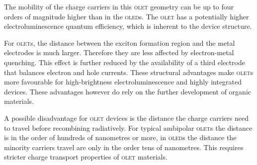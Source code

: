 The mobility of the charge carriers in this \textsc{olet} geometry can be up to four orders of magnitude higher than in the \textsc{oled}s. The \textsc{olet} has a potentially higher electroluminescence quantum efficiency, which is inherent to the device structure.

For \textsc{olet}s, the distance between the exciton formation region and the metal electrodes is much larger. Therefore they are less affected by electron-metal quenching. This effect is further reduced by the availability of a third electrode that balances electron and hole currents. These structural advantages make \textsc{olet}s more favourable for high-brightness electroluminescence and highly integrated devices. These advantages however do rely on the further development of organic materials.


A possible disadvantage for \textsc{olet} devices is the distance the charge carriers need to travel before recombining radiatively. For typical ambipolar \textsc{olet}s the distance is in the order of hundreds of nanometres or more, in \textsc{oled}s the distance the minority carriers travel are only in the order tens of nanometres. This requires stricter charge transport properties of \textsc{olet} materials.
